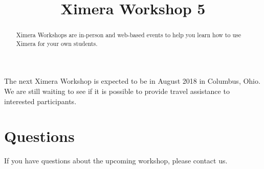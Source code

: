 \documentclass{ximera}
\title{Ximera Workshop 5}
\begin{document}
\begin{abstract}
  Ximera Workshops are in-person and web-based events to help you learn how to use Ximera for your own students.
\end{abstract}
\maketitle

The next Ximera Workshop is expected to be in August 2018 in Columbus,
Ohio.  We are still waiting to see if it is possible to provide travel
assistance to interested participants.

\section{Questions}

If you have questions about the upcoming workshop, please contact us.
\end{document}
